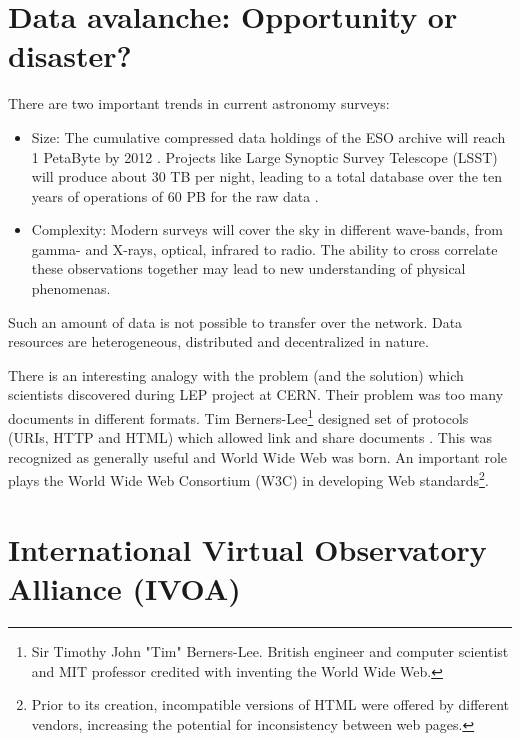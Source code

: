 \section{ Data avalanche: Opportunity or disaster?}

There are two important trends in current astronomy surveys:

\begin{itemize}

  \item{Size:} The cumulative compressed data holdings of the ESO archive will
    reach 1 PetaByte by 2012 \cite{hanisch2010international}. Projects
    like Large Synoptic Survey Telescope (LSST) will produce about 30
    TB per night, leading to a total database over the ten years of
    operations of 60 PB for the raw data \cite{becla2006designing}.
   
  \item{Complexity:} Modern surveys will cover the sky in different
    wave-bands, from gamma- and X-rays, optical, infrared to
    radio. The ability to cross correlate these observations together
    may lead to new understanding of physical
    phenomenas. \cite{hanisch2010international}
\end{itemize}



Such an amount of data is not possible to transfer over the
network. Data resources are heterogeneous, distributed and
decentralized in nature.


There is an interesting analogy with the problem (and the solution)
which scientists discovered during LEP project at CERN.  Their problem
was too many documents in different formats. Tim Berners-Lee\footnote{
  Sir Timothy John "Tim" Berners-Lee. British engineer and computer
  scientist and MIT professor credited with inventing the World Wide
  Web.} designed set of protocols (URIs, HTTP and HTML) which allowed
link and share documents \citep{berners1990worldwideweb}. This was
recognized as generally useful and World Wide Web was born. An
important role plays the World Wide Web Consortium (W3C) in developing
Web standards\footnote{Prior to its creation, incompatible versions of
  HTML were offered by different vendors, increasing the potential for
  inconsistency between web pages.}.
    
    
\section{International Virtual Observatory Alliance (IVOA)}

